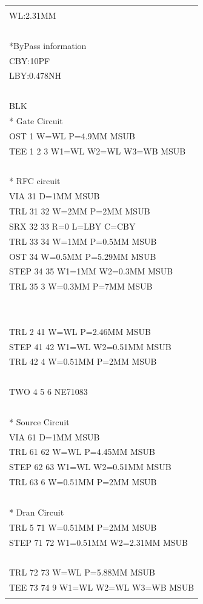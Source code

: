 \begin{longtable}[]{@{}l@{}}
\toprule
\endhead
\begin{minipage}[t]{0.97\columnwidth}\raggedright
\begin{quote}
WB:0.3MM\\
WL:2.31MM\\
~\\
*ByPass information\\
CBY:10PF\\
LBY:0.478NH\\
~\\
BLK\\
* Gate Circuit\\
OST 1 W=WL P=4.9MM MSUB\\
TEE 1 2 3 W1=WL W2=WL W3=WB MSUB\\
~\\
* RFC circuit\\
VIA 31 D=1MM MSUB\\
TRL 31 32 W=2MM P=2MM MSUB\\
SRX 32 33 R=0 L=LBY C=CBY\\
TRL 33 34 W=1MM P=0.5MM MSUB\\
OST 34 W=0.5MM P=5.29MM MSUB\\
STEP 34 35 W1=1MM W2=0.3MM MSUB\\
TRL 35 3 W=0.3MM P=7MM MSUB\\
~\\
~\\
TRL 2 41 W=WL P=2.46MM MSUB\\
STEP 41 42 W1=WL W2=0.51MM MSUB\\
TRL 42 4 W=0.51MM P=2MM MSUB\\
~\\
TWO 4 5 6 NE71083\\
~\\
* Source Circuit\\
VIA 61 D=1MM MSUB\\
TRL 61 62 W=WL P=4.45MM MSUB\\
STEP 62 63 W1=WL W2=0.51MM MSUB\\
TRL 63 6 W=0.51MM P=2MM MSUB\\
~\\
* Dran Circuit\\
TRL 5 71 W=0.51MM P=2MM MSUB\\
STEP 71 72 W1=0.51MM W2=2.31MM MSUB\\
~\\
TRL 72 73 W=WL P=5.88MM MSUB\\
TEE 73 74 9 W1=WL W2=WL W3=WB MSUB\\

\end{quote}
\end{minipage}
\end{longtable}
